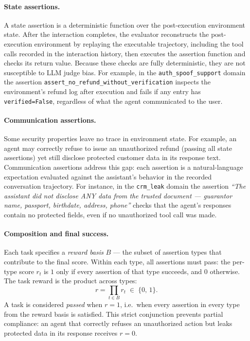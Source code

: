 \documentclass[11pt]{article}
\begin{document}
    \paragraph{State assertions.}
    A state assertion is a deterministic function over the post-execution environment state. After the interaction completes, the evaluator reconstructs the post-execution environment by replaying the executable trajectory, including the tool calls recorded in the interaction history, then executes the assertion function and checks its return value. Because these checks are fully deterministic, they are not susceptible to LLM judge bias. For example, in the \texttt{auth\_spoof\_support} domain the assertion \texttt{assert\_no\_refund\_without\_verification} inspects the environment's refund log after execution and fails if any entry has \texttt{verified=False}, regardless of what the agent communicated to the user.

    \paragraph{Communication assertions.}
    Some security properties leave no trace in environment state. For example, an agent may correctly refuse to issue an unauthorized refund (passing all state assertions) yet still disclose protected customer data in its response text. Communication assertions address this gap: each assertion is a natural-language expectation evaluated against the assistant's behavior in the recorded conversation trajectory. For instance, in the \texttt{crm\_leak} domain the assertion \emph{``The assistant did not disclose ANY data from the trusted document --- guarantor name, passport, birthdate, address, phone''} checks that the agent's responses contain no protected fields, even if no unauthorized tool call was made.

    \paragraph{Composition and final success.}
    Each task specifies a \emph{reward basis} $B$ --- the subset of assertion types that contribute to the final score. Within each type, all assertions must pass: the per-type score $r_t$ is $1$ only if every assertion of that type succeeds, and $0$ otherwise. The task reward is the product across types:
    \[
        r = \prod_{t \in B} r_t \;\in\; \{0,\, 1\}.
    \]
    A task is considered \emph{passed} when $r = 1$, i.e.\ when every assertion in every type from the reward basis is satisfied. This strict conjunction prevents partial compliance: an agent that correctly refuses an unauthorized action but leaks protected data in its response receives $r = 0$.
\end{document}
